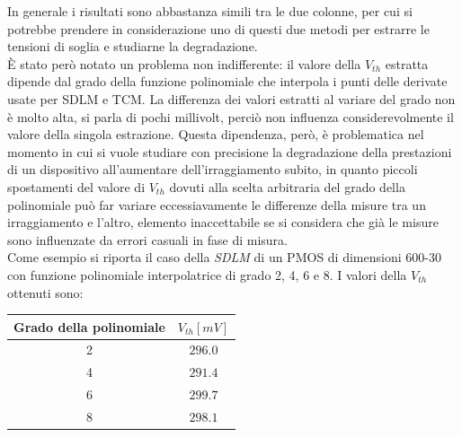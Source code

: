 \documentclass[12pt, letterpaper]{book}
\begin{document}
In generale i risultati sono abbastanza simili tra le due colonne, per cui si potrebbe prendere in considerazione uno di questi due metodi  per estrarre le tensioni di soglia e studiarne la degradazione.\\
È stato però notato un problema non indifferente: il valore della $V_{th}$ estratta dipende dal grado della funzione polinomiale che interpola i punti delle derivate usate per SDLM e TCM. La differenza dei valori estratti al variare del grado non è molto alta, si parla di pochi millivolt, perciò non influenza considerevolmente il valore della singola estrazione. Questa dipendenza, però, è problematica nel momento in cui si vuole studiare con precisione la degradazione della prestazioni di un dispositivo all'aumentare dell'irraggiamento subito, in quanto piccoli spostamenti del valore di $V_{th}$ dovuti alla scelta arbitraria del grado della polinomiale può far variare eccessiavamente le differenze della misure tra un irraggiamento e l'altro, elemento inaccettabile se si considera che già le misure sono influenzate da errori casuali in fase di misura.\\
Come esempio si riporta il caso della \emph{SDLM} di un PMOS di dimensioni 600-30 con funzione polinomiale interpolatrice di grado 2, 4, 6 e 8. I valori della $V_{th}$ ottenuti sono: 

\begin{center}
\begin{tabular}{| c | c |}
\hline
Grado della polinomiale& $V_{th}[mV]$ \\
\hline
2  & $296.0$ \\
4  & $291.4$ \\
6  & $299.7$ \\
8  & $298.1$ \\
\hline

\end{tabular}
\end{center}
\end{document}
